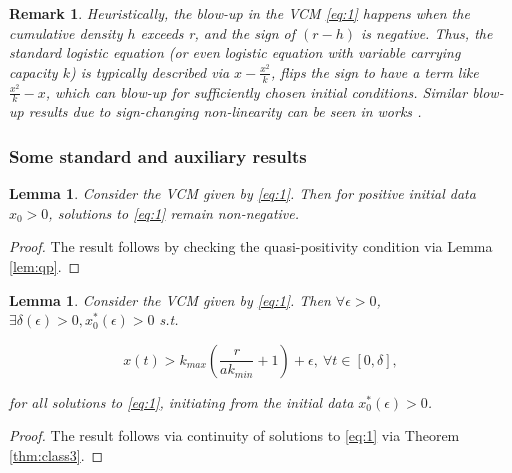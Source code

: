 \documentclass[sn-mathphys-num]{sn-jnl}
\newtheorem{lemma}[theorem]{Lemma}
\newtheorem{remark}{Remark}
\numberwithin{equation}{section}
\numberwithin{equation}{section}
\begin{document}
\begin{remark}
Heuristically, the blow-up in the VCM \eqref{eq:1} happens when the cumulative density $h$ exceeds r, and the sign of $(r-h)$ is negative. Thus, the standard logistic equation (or even logistic equation with variable carrying capacity $k$) is typically described via $x - \frac{x^{2}}{k}$, flips the sign to have a term like
$\frac{x^{2}}{k} - x$, which can blow-up for sufficiently chosen initial conditions. Similar blow-up results due to sign-changing non-linearity can be seen in works \cite{S47, T22a}.
    \end{remark}



    
\subsubsection{Some standard and auxiliary results}
\begin{lemma}
Consider the VCM given by \eqref{eq:1}. Then for positive initial data  $x_{0} > 0$, solutions to 
\eqref{eq:1} remain non-negative.
\label{lemma:VNLM_1}
\end{lemma}

\begin{proof}
The result follows by checking the quasi-positivity condition via Lemma \ref{lem:qp}.
\end{proof}
\begin{lemma}
\label{lem:l1}
Consider the VCM given by \eqref{eq:1}. Then $\forall \epsilon > 0$, $\exists \delta(\epsilon) > 0, x^{*}_{0}(\epsilon) > 0$ s.t.

\begin{equation}
x(t) > k_{max}\left( \frac{r}{a k_{min}}  + 1 \right) + \epsilon, \ \forall t \in [0,\delta],
\end{equation}

for all solutions to \eqref{eq:1}, initiating from the initial data $x^{*}_{0}(\epsilon) > 0$.
\end{lemma}

\begin{proof}
The result follows via continuity of solutions to \eqref{eq:1} via Theorem \ref{thm:class3}.
\end{proof}
\end{document}
